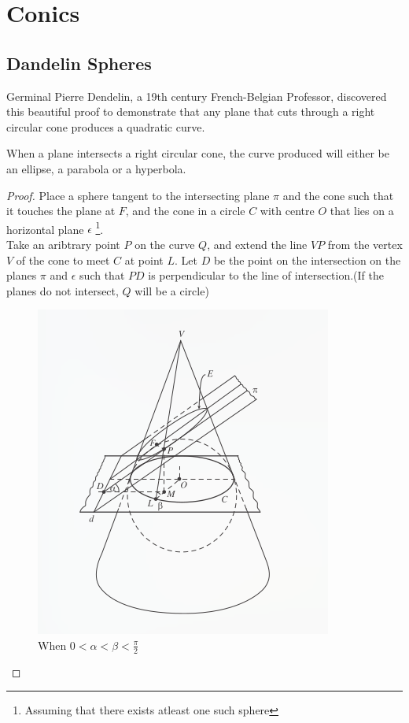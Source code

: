 \chapter{Conics}

\section{Dandelin Spheres}
Germinal Pierre Dendelin, a 19th century French-Belgian Professor, discovered this beautiful proof
to demonstrate that any plane that cuts through a right circular cone produces a quadratic curve.
\begin{thm}
  When a plane intersects a right circular cone, the curve produced will either be an ellipse, a parabola or a hyperbola.
\end{thm}
\begin{proof}
  Place a sphere tangent to the intersecting plane $\pi$ and the cone such that it touches the plane at $F$, and the
  cone in a circle $C$ with centre $O$ that lies on a horizontal plane $\epsilon$
  \footnote{Assuming that there exists atleast one such sphere}.\\
  Take an aribtrary point $P$ on the curve $Q$, and extend the line $VP$ from the vertex $V$ of the cone
  to meet $C$ at point $L$. Let $D$ be the point on the intersection on the planes $\pi$ and $\epsilon$ such that
  $PD$ is perpendicular to the line of intersection.(If the planes do not intersect, $Q$ will be a circle)


  \begin{figure}[ht!]
    \includegraphics[width=\linewidth]{dandelin.png}
    \caption{When $0<\alpha<\beta<\frac{\pi}{2}$}
  \end{figure}


\end{proof}
